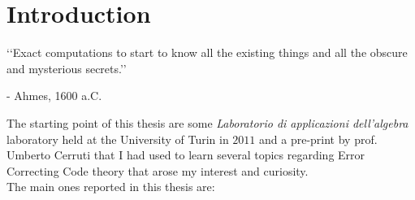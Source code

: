 

\chapter*{Introduction}

\begin{flushright}
\lq\lq Exact computations to start to know all the existing things and all the obscure and mysterious secrets.\rq\rq
\vspace*{0.3cm}

- Ahmes, 1600 a.C.
\end{flushright}

\vspace*{0.6cm}

The starting point of this thesis are some \emph{Laboratorio di applicazioni dell'algebra} laboratory held at the University of Turin in $2011$ and a pre-print by prof. Umberto Cerruti \cite{cerruti} that I had used to learn several topics regarding Error Correcting Code theory that arose my interest and curiosity.\\
The main ones reported in this thesis are:
